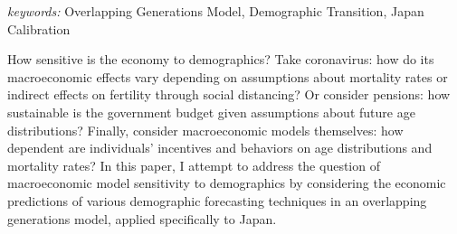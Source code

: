 \documentclass[10pt]{article}
\renewcommand{\thesection}{\arabic{section}}
\renewcommand{\section}[2][]{\oldsection[#1]{#2}\index{#1}\label{sec:\thesection}}
\numberwithin{equation}{subsection}
\begin{document}

\vspace{3mm}

\noindent\textit{keywords:}\:
Overlapping Generations Model,
Demographic Transition,
Japan Calibration

\vspace{3mm}


\section{Introduction}

\par How sensitive is the economy to demographics? Take coronavirus: how do its macroeconomic effects vary depending on assumptions about mortality rates or indirect effects on fertility through social distancing? Or consider pensions: how sustainable is the government budget given assumptions about future age distributions? Finally, consider macroeconomic models themselves: how dependent are individuals' incentives and behaviors on age distributions and mortality rates? In this paper, I attempt to address the question of macroeconomic model sensitivity to demographics by considering the economic predictions of various demographic forecasting techniques in an overlapping generations model, applied specifically to Japan.
\end{document}
